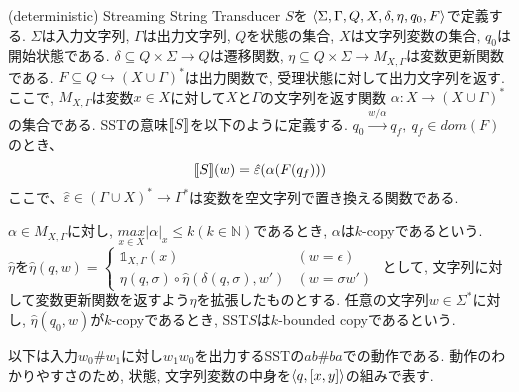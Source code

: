\documentclass[uplatex,dvipdfmx,a4j]{jsreport}
\begin{document}
  \begin{definition}[SST] \label{def: SST}
    (deterministic) Streaming String Transducer $S$を
    ${\langle {\Sigma, \Gamma, Q, X, \delta, \eta, q_0, F} \rangle}$で定義する.
    $\Sigma$は入力文字列, $\Gamma$は出力文字列, $Q$を状態の集合, $X$は文字列変数の集合, $q_0$は開始状態である.
    $\delta \subseteq Q \times \Sigma \rightarrow Q$は遷移関数,
    $\eta \subseteq Q \times \Sigma \rightarrow M_{X, \Gamma}$は変数更新関数である.
    $F \subseteq Q \hookrightarrow (X \cup \Gamma)^*$は出力関数で, 受理状態に対して出力文字列を返す.
    ここで, $M_{X, \Gamma}$は変数$x \in X$に対して$X$と$\Gamma$の文字列を返す関数
    $\alpha: X \rightarrow (X \cup \Gamma)^*$の集合である.
    SSTの意味${[ \! [{S}] \! ]}$を以下のように定義する.
    $q_0 \overset{w / \alpha}{\longrightarrow} q_f,\ q_f \in dom(F)$のとき、
    \[
    {[ \! [{S}] \! ]}(w) = \hat{\varepsilon}(\alpha (F(q_f)))
    \]
    ここで、$\hat{\varepsilon} \in (\Gamma \cup X)^* \to \Gamma ^*$は変数を空文字列で置き換える関数である.

    $\alpha \in M_{X, \Gamma}$に対し,
    $\underset{x \in X}{max} |\alpha|_x \leq k (k \in \mathbb{N})$であるとき,
    $\alpha$は$k$-copyであるという. \\
    $\hat{\eta}$を$\hat{\eta}(q, w) =
    \begin{cases}
      \mathbb{1}_{X, \Gamma}(x) & (w = \epsilon) \\
      \eta(q, \sigma) \circ \hat{\eta}(\delta(q, \sigma), w') & (w = \sigma w')
    \end{cases}
    $
    として, 文字列に対して変数更新関数を返すよう$\eta$を拡張したものとする.
    任意の文字列$w \in \Sigma^*$に対し, $\hat{\eta}(q_0, w)$が$k$-copyであるとき,
    SST$S$は$k$-bounded copyであるという.
  \end{definition}

  以下は入力$w_0 \# w_1$に対し$w_1w_0$を出力するSSTの$ab \# ba$での動作である.
  動作のわかりやすさのため, 状態, 文字列変数の中身を${\langle {q, [x, y]} \rangle}$の組みで表す.
\end{document}
